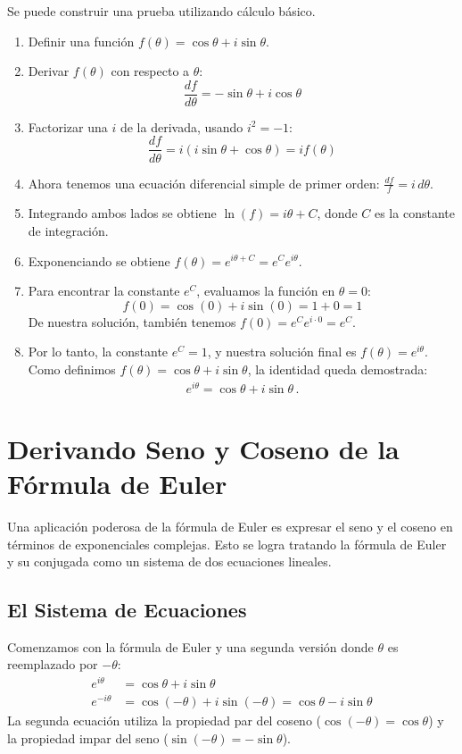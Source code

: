\documentclass[11pt,a4paper]{article}
\begin{document}
Se puede construir una prueba utilizando cálculo básico.
\begin{enumerate}
    \item Definir una función $f(\theta) = \cos\theta + i\sin\theta$.
    \item Derivar $f(\theta)$ con respecto a $\theta$:
    \[ \frac{df}{d\theta} = -\sin\theta + i\cos\theta \]
    \item Factorizar una $i$ de la derivada, usando $i^2=-1$:
    \[ \frac{df}{d\theta} = i(i\sin\theta + \cos\theta) = i f(\theta) \]
    \item Ahora tenemos una ecuación diferencial simple de primer orden: $\frac{df}{f} = i \, d\theta$.
    \item Integrando ambos lados se obtiene $\ln(f) = i\theta + C$, donde $C$ es la constante de integración.
    \item Exponenciando se obtiene $f(\theta) = e^{i\theta+C} = e^C e^{i\theta}$.
    \item Para encontrar la constante $e^C$, evaluamos la función en $\theta=0$:
    \[ f(0) = \cos(0) + i\sin(0) = 1 + 0 = 1 \]
    De nuestra solución, también tenemos $f(0) = e^C e^{i \cdot 0} = e^C$.
    \item Por lo tanto, la constante $e^C=1$, y nuestra solución final es $f(\theta) = e^{i\theta}$. Como definimos $f(\theta) = \cos\theta + i\sin\theta$, la identidad queda demostrada:
    \begin{align}
    \boxed{
        e^{i\theta} = \cos\theta + i\sin\theta\,.
        }
    \end{align}
\end{enumerate}

\section{Derivando Seno y Coseno de la Fórmula de Euler}
Una aplicación poderosa de la fórmula de Euler es expresar el seno y el coseno en términos de exponenciales complejas. Esto se logra tratando la fórmula de Euler y su conjugada como un sistema de dos ecuaciones lineales.

\subsection{El Sistema de Ecuaciones}
Comenzamos con la fórmula de Euler y una segunda versión donde $\theta$ es reemplazado por $-\theta$:
\begin{align*}
    e^{i\theta} &= \cos\theta + i\sin\theta \tag{A.1} \\
    e^{-i\theta} &= \cos(-\theta) + i\sin(-\theta) = \cos\theta - i\sin\theta \tag{A.2}
\end{align*}
La segunda ecuación utiliza la propiedad par del coseno ($\cos(-\theta)=\cos\theta$) y la propiedad impar del seno ($\sin(-\theta)=-\sin\theta$).
\end{document}

